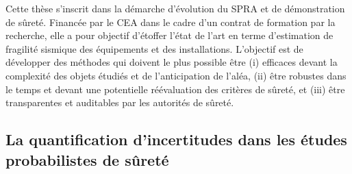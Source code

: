 





Cette thèse s'inscrit dans la démarche d'évolution du SPRA et de démonstration de sûreté. Financée par le CEA dans le cadre d'un contrat de formation par la recherche, elle a pour objectif d'étoffer l'état de l'art en terme d'estimation de fragilité sismique des équipements et des installations.
L'objectif est de développer des méthodes qui doivent le plus possible être (i) efficaces devant la complexité des objets étudiés et de l'anticipation de l'aléa, (ii) être robustes dans le temps et devant une potentielle réévaluation des critères de sûreté, et (iii) être transparentes et auditables par les autorités de sûreté.






\subsection{La quantification d'incertitudes dans les études probabilistes de sûreté} %


